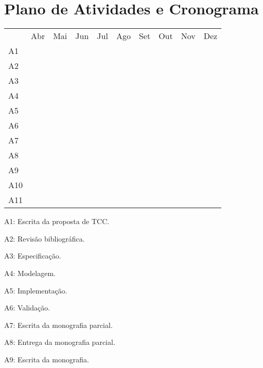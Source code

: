 \documentclass[tcc-proposta]{texufpel}
\begin{document}
\chapter{Plano de Atividades e Cronograma}

\begin{table}[h!]
	\centering
	\label{my-label}
	\begin{tabular}{llllllllll}
		& Abr & Mai & Jun & Jul & Ago & Set & Out & Nov & Dez \\
	A1 & \cellcolor[HTML]{9B9B9B} &  &  &  &  &  &  &  &  \\
	A2 &  & \cellcolor[HTML]{9B9B9B} & \cellcolor[HTML]{9B9B9B} &  &  &  &  &  &  \\
	A3 &  &  & \cellcolor[HTML]{9B9B9B} &  &  &  &  &  &  \\
	A4 &  &  & \cellcolor[HTML]{9B9B9B} & \cellcolor[HTML]{9B9B9B} &  &  &  &  &  \\
	A5 &  &  &  & \cellcolor[HTML]{9B9B9B} & \cellcolor[HTML]{9B9B9B} & \cellcolor[HTML]{9B9B9B} & \cellcolor[HTML]{9B9B9B} & \cellcolor[HTML]{9B9B9B} &  \\
	A6 &  &  &  &  &  &  &  & \cellcolor[HTML]{9B9B9B} & \cellcolor[HTML]{9B9B9B} \\
	A7 &  & \cellcolor[HTML]{9B9B9B} & \cellcolor[HTML]{9B9B9B} & \cellcolor[HTML]{9B9B9B} &  &  &  &  &  \\
	A8 &  &  &  & \cellcolor[HTML]{9B9B9B} &  &  &  &  &  \\
	A9 &  &  &  & \cellcolor[HTML]{9B9B9B} & \cellcolor[HTML]{9B9B9B} & \cellcolor[HTML]{9B9B9B} & \cellcolor[HTML]{9B9B9B} & \cellcolor[HTML]{9B9B9B} &  \\
	A10 &  &  &  &  &  &  &  & \cellcolor[HTML]{9B9B9B} &  \\
	A11 &  &  &  &  &  &  &  &  & \cellcolor[HTML]{9B9B9B}
	\end{tabular}
\end{table}

A1: Escrita da proposta de TCC.

A2: Revisão bibliográfica.

A3: Especificação.

A4: Modelagem.

A5: Implementação.

A6: Validação.

A7: Escrita da monografia parcial.

A8: Entrega da monografia parcial.

A9: Escrita da monografia.
\end{document}

